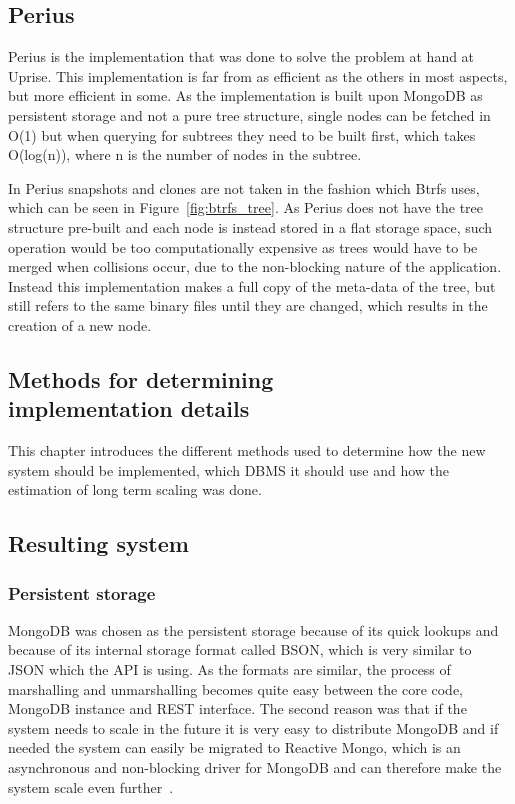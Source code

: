 \documentclass[a4paper,12pt]{article}
\newcounter{subsubsubsection}[subsubsection]
\begin{document}
\subsection{Perius}
Perius is the implementation that was done to solve the problem at hand at Uprise. This implementation is far from as 
efficient as the others in most aspects, but more efficient in some. As the implementation is built upon MongoDB as 
persistent storage and not a pure tree structure, single nodes can be fetched in O(1) but when querying for subtrees 
they need to be built first, which takes O(log(n)), where n is the number of nodes in the subtree. 

In Perius snapshots and clones are not taken in the fashion which Btrfs uses, which can be seen in 
Figure~\ref{fig:btrfs_tree}. As Perius does not have the tree structure pre-built and each node is instead stored in a 
flat storage space, such operation would be too computationally expensive as trees would have to be merged when 
collisions occur, due to the non-blocking nature of the application. Instead this implementation makes a full copy of 
the meta-data of the tree, but still refers to the same binary files until they are changed, which results in the 
creation of a new node.

\subsection{Methods for determining\\implementation details}
This chapter introduces the different methods used to determine how the new system should be implemented, 
which DBMS it should use and how the estimation of long term scaling was done.

\subsection{Resulting system}
\subsubsection{Persistent storage}
MongoDB was chosen as the persistent storage because of its quick lookups and because of its internal storage 
format called BSON, which is very similar to JSON which the API is using. As the formats are similar, the process of 
marshalling and unmarshalling becomes quite easy between the core code, MongoDB instance and REST interface. 
The second reason was that if the system needs to scale in the future it is very easy to distribute MongoDB and if 
needed the system can easily be migrated to Reactive Mongo, which is an asynchronous and 
non-blocking driver for MongoDB and can therefore make the system scale even further~\cite{REACTIVEMONGO}.
\end{document}

